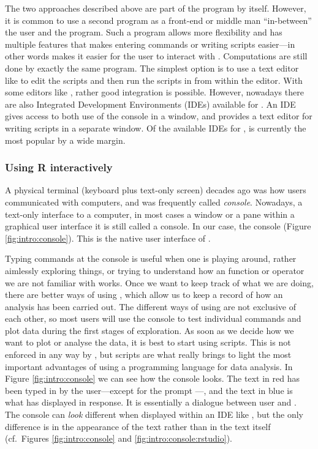 \documentclass[krantz2]{krantz}\usepackage{knitr}%
\begin{document}
The two approaches described above are part of the \Rpgrm program by itself. However, it is common to use a second program as a front-end or middle man ``in-between'' the user and the \Rpgrm program. Such a program allows more flexibility and has multiple features that makes entering commands or writing scripts easier---in other words makes it easier for the user to interact with \Rpgrm. Computations are still done by exactly the same \Rpgrm program. The simplest option is to use a text editor like  to edit the scripts and then run the scripts in \Rpgrm from within the editor. With some editors like , rather good integration is possible. However, nowadays there are also Integrated Development Environments (IDEs) available for \Rpgrm. An IDE gives access to both use of the \Rpgrm console in a window, and provides a text editor for writing scripts in a separate window. Of the available IDEs for \Rpgrm, \RStudio is currently the most popular by a wide margin.

\subsubsection{Using R interactively}

A physical terminal (keyboard plus text-only screen) decades ago was how users communicated with computers, and was frequently called \emph{console}. Nowadays, a text-only interface to a computer, in most cases a window or a pane within a graphical user interface it is still called a console. In our case, the \Rpgrm console (Figure \ref{fig:intro:console}). This is the native user interface of \Rpgrm.

Typing commands at the \Rpgrm console is useful when one is playing around, rather aimlessly exploring things, or trying to understand how an \Rpgrm function or operator we are not familiar with works. Once we want to keep track of what we are doing, there are better ways of using \Rpgrm, which allow us to keep a record of how an analysis has been carried out. The different ways of using \Rpgrm are not exclusive of each other, so most users will use the \Rpgrm console to test individual commands and plot data during the first stages of exploration. As soon as we decide how we want to plot or analyse the data, it is best to start using scripts. This is not enforced in any way by \Rpgrm, but scripts are what really brings to light the most important advantages of using a programming language for data analysis. In Figure \ref{fig:intro:console} we can see how the \Rpgrm console looks. The text in red has been typed in by the user---except for the prompt \code{$>$}---, and the text in blue is what \Rpgrm has displayed in response. It is essentially a dialogue between user and \Rpgrm. The console can \emph{look} different when displayed within an IDE like \RStudio, but the only difference is in the appearance of the text rather than in the text itself (cf.\ Figures \ref{fig:intro:console} and \ref{fig:intro:console:rstudio}).
\end{document}
